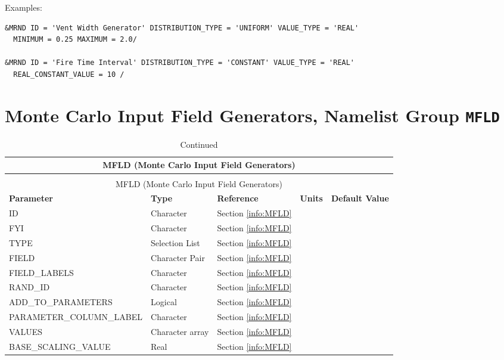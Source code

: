 \noindent Examples:
\begin{lstlisting}
&MRND ID = 'Vent Width Generator' DISTRIBUTION_TYPE = 'UNIFORM' VALUE_TYPE = 'REAL'
  MINIMUM = 0.25 MAXIMUM = 2.0/

&MRND ID = 'Fire Time Interval' DISTRIBUTION_TYPE = 'CONSTANT' VALUE_TYPE = 'REAL'
  REAL_CONSTANT_VALUE = 10 /
\end{lstlisting}


\clearpage

\section{Monte Carlo Input Field Generators, Namelist Group \texorpdfstring{{\tt MFLD}}{MFLD}}

\noindent
\renewcommand{\tabcolsep}{.1in}
\begin{longtable}{|l|l|l|l|l|}
\caption[Monte Carlo Input Field Generators ({\ct MFLD} namelist group)]{For more information see Section~\ref{info:MFLD}.}
\label{tbl:MFLD} \\
\hline
\multicolumn{5}{|c|}{{\ct MFLD} (Monte Carlo Input Field Generators)} \\
\hline \hline
\endfirsthead
\caption[]{Continued} \\
\hline
\multicolumn{5}{|c|}{{\ct MFLD} (Monte Carlo Input Field Generators)} \\
\hline \hline
\endhead
\small
\parbox{1.5in}{\bf Parameter}    & \parbox{1in}{\bf Type}  & \parbox{1in}{\bf Reference}  & \parbox{1in}{\bf Units}  & \parbox{1in}{\bf Default Value} \\ \hline
{\ct ID}                         & Character         & Section \ref{info:MFLD}   &      &     \\ \hline
{\ct FYI}                        & Character         & Section \ref{info:MFLD}   &      &     \\ \hline
{\ct TYPE}                       & Selection List    & Section \ref{info:MFLD}   &      &     \\ \hline
{\ct FIELD}                      & Character Pair    & Section \ref{info:MFLD}   &      &     \\ \hline
{\ct FIELD\_LABELS}              & Character         & Section \ref{info:MFLD}   &      &     \\ \hline
{\ct RAND\_ID}                   & Character         & Section \ref{info:MFLD}   &      &     \\ \hline
{\ct ADD\_TO\_PARAMETERS}        & Logical           & Section \ref{info:MFLD}   &      &     \\ \hline
{\ct PARAMETER\_COLUMN\_LABEL}   & Character         & Section \ref{info:MFLD}   &      &     \\ \hline
{\ct VALUES}                     & Character array   & Section \ref{info:MFLD}   &      &     \\ \hline
{\ct BASE\_SCALING\_VALUE}       & Real              & Section \ref{info:MFLD}   &      &     \\ \hline

\end{longtable}

